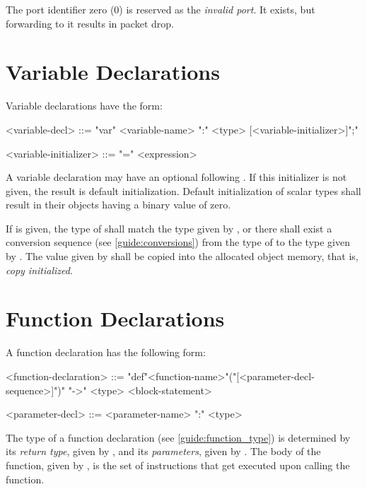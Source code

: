 The port identifier zero (0) is reserved as the \textit{invalid port}. It exists, but forwarding to it results in packet drop.

\section{Variable Declarations} \label{guide:variables}

Variable declarations have the form:

\begin{minip}
\begin{grammar}
<variable-decl> ::=
"var" <variable-name> ":" <type> [<variable-initializer>]";"

<variable-initializer> ::= "=" <expression>
\end{grammar}
\end{minip}

A variable declaration may have an optional  following .  If this initializer is not given, the result is default initialization. Default initialization of scalar types shall result in their objects having a binary value of zero.

If  is given, the type of  shall match the type given by , or there shall exist a conversion sequence (see \ref{guide:conversions}) from the type of  to the type given by . The value given by  shall be copied into the allocated object memory, that is, \textit{copy initialized}.

\section{Function Declarations} \label{guide:function}

A function declaration has the following form:

\begin{minip}
\begin{grammar}
<function-declaration> ::=
"def"<function-name>"("[<parameter-decl-sequence>]")" "->" <type> <block-statement>

<parameter-decl> ::= <parameter-name> ":" <type>
\end{grammar}
\end{minip}

The type of a function declaration (see \ref{guide:function_type}) is determined by its \textit{return type}, given by , and its \textit{parameters}, given by . The body of the function, given by , is the set of instructions that get executed upon calling the function.

